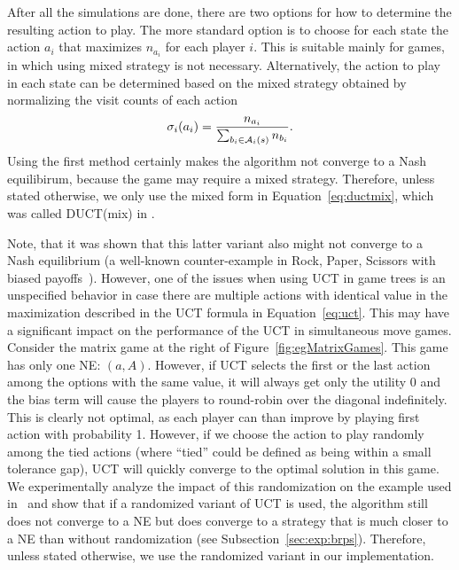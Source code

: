 After all the simulations are done, there are two options for how to determine the resulting action to play.
The more standard option is to choose for each state the action $a_i$ that maximizes $n_{a_i}$ for each player $i$.
This is suitable mainly for games, in which using mixed strategy is not necessary.
Alternatively, the action to play in each state can be determined based on the mixed strategy obtained by normalizing the visit counts of each action
\begin{equation}
\sigma_i(a_i) = \frac{n_{a_i}}{\sum_{b_i\in \mathcal{A}_i(s)} n_{b_i}}.
\label{eq:ductmix}
\end{equation}
Using the first method certainly makes the algorithm not converge to a Nash equilibirum, because the game may require a mixed strategy.
Therefore, unless stated otherwise, we only use the mixed form in Equation~\ref{eq:ductmix}, which was called DUCT(mix) in 
\cite{Lanctot13Goofspiel,Tak14smmcts}. %

Note, that it was shown that this latter variant also might not converge to a Nash equilibrium (a well-known counter-example in Rock, Paper, Scissors with biased payoffs~\cite{Shafiei09}).
However, one of the issues when using UCT in game trees is an unspecified behavior in case there are multiple actions with identical value in the maximization described in the UCT formula in Equation~\ref{eq:uct}.
This may have a significant impact on the performance of the UCT in simultaneous move games.
Consider the matrix game at the right of Figure~\ref{fig:egMatrixGames}.
This game has only one NE: $(a,A)$. However, if UCT selects the first or the last action among the options with the same value, it will always get only the utility 0 and the bias term will cause the players to round-robin over the diagonal indefinitely. This is clearly not optimal, as each player can than improve by playing first action with probability 1. However, if we choose the action to play randomly among the tied actions (where ``tied'' could be defined as being within a small tolerance gap), UCT will quickly converge to the optimal solution in this game.
We experimentally analyze the impact of this randomization on the example used in~\cite{Shafiei09} and show that if a randomized variant of UCT is used, the algorithm still does not converge to a NE but does converge to a strategy that is much closer to a NE than without randomization (see Subsection~\ref{sec:exp:brps}).
Therefore, unless stated otherwise, we use the randomized variant in our implementation.

